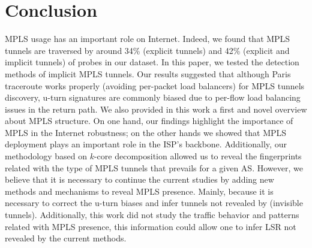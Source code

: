 \section{Conclusion}\label{ccl}
MPLS usage has an important role on Internet. Indeed, we found that MPLS tunnels
are traversed by around 34\% (explicit tunnels) and 42\% (explicit and implicit
tunnels) of \traceroute probes in our dataset. In this paper, we tested the
detection methods of implicit MPLS tunnels. Our results suggested that although
Paris traceroute works properly (avoiding per-packet load balancers) for MPLS
tunnels discovery, u-turn signatures are commonly biased due to per-flow load
balancing issues in the return path. We also provided in this work a first and
novel overview about MPLS structure. On one hand, our findings highlight the
importance of MPLS in the Internet robustness; on the other hands we showed that
MPLS deployment plays an important role in the ISP's backbone. Additionally, our
methodology based on $k$-core decomposition allowed us to reveal the
fingerprints related with the type of MPLS tunnels that prevails for a given AS.
However, we believe that it is necessary to continue the current studies by
adding new methods and mechanisms to reveal MPLS presence. Mainly, because it is
necessary to correct the u-turn biases and infer tunnels not revealed by
\traceroute (invisible tunnels). Additionally, this work did not study the
traffic behavior and patterns related with MPLS presence, this information could
allow one to infer LSR not revealed by the current methods.